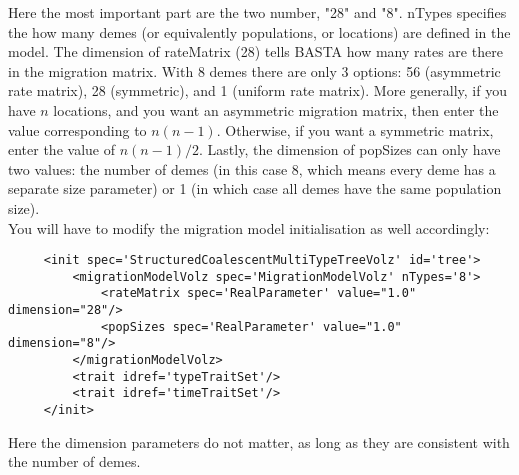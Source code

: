 \documentclass[10pt,letterpaper]{article}
\begin{document}
Here the most important part are the two number, "28" and "8". nTypes specifies the how many demes (or equivalently populations, or locations) are defined in the model.
The dimension of rateMatrix (28) tells BASTA how many rates are there in the migration matrix. With 8 demes there are only 3 options: 56 (asymmetric rate matrix), 28 (symmetric), and 1 (uniform rate matrix).
More generally, if you have $n$ locations, and you want an asymmetric migration matrix, then enter the value corresponding to $n(n-1)$. Otherwise, if you want a symmetric matrix, enter the value of $n(n-1)/2$.
Lastly, the dimension of popSizes can only have two values: the number of demes (in this case 8, which means every deme has a separate size parameter) or 1 (in which case all demes have the same population size).\\

You will have to modify the migration model initialisation as well accordingly:

\begin{lstlisting}
     <init spec='StructuredCoalescentMultiTypeTreeVolz' id='tree'>
         <migrationModelVolz spec='MigrationModelVolz' nTypes='8'>
             <rateMatrix spec='RealParameter' value="1.0" dimension="28"/>
             <popSizes spec='RealParameter' value="1.0" dimension="8"/>
         </migrationModelVolz>
         <trait idref='typeTraitSet'/>
         <trait idref='timeTraitSet'/>
     </init>
\end{lstlisting}

Here the dimension parameters do not matter, as long as they are consistent with the number of demes.


%
%
%
\end{document}
